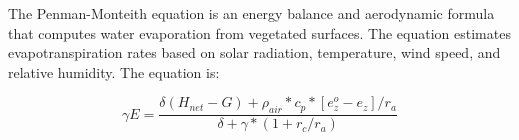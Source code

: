 The Penman-Monteith equation is an energy balance and aerodynamic formula that computes water evaporation from vegetated surfaces.  The equation estimates evapotranspiration rates based on solar radiation, temperature, wind speed, and relative humidity.  The equation is:

\begin{equation}
	\gamma E = \frac{\delta(H_{net}-G) + \rho_{air} * c_p * [e_z^o-e_z]/r_a}
	{\delta + \gamma * (1 + r_c/r_a)}
\end{equation}

